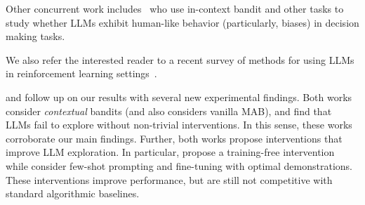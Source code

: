 Other concurrent work includes~\citet{schubert2024context,hayes2024relative,coda2024cogbench} who use in-context bandit and other tasks to study whether LLMs exhibit human-like behavior (particularly, biases) in decision making tasks. 

We also refer the interested reader to a recent survey of methods for using LLMs in reinforcement learning settings~\citep{cao2024survey}.


\citet{monea2024llms} and \citet{nie2024evolve} follow up on our results with several new experimental findings. Both works consider \emph{contextual} bandits (and \citet{nie2024evolve} also considers vanilla MAB), and find that LLMs fail to explore without non-trivial interventions. In this sense, these works corroborate our main findings. Further, both works propose interventions that improve LLM exploration. In particular, \citet{monea2024llms} propose a training-free intervention 
while \citet{nie2024evolve} consider few-shot prompting and fine-tuning with optimal demonstrations. These interventions improve performance, but are still not competitive with standard algorithmic baselines.







